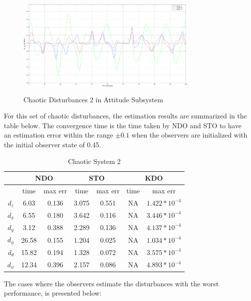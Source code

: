 \documentclass[letterpaper%
, twoside%
, 12pt%
,memoire%
, english%
,creativecommons,hyperref%
]{thETS}
\begin{document}
\begin{figure}[H]
\centering
\includegraphics[width=3.5in,height=2in]{Figures/results/chaotic_disturbances/dis_m2_att.eps}
\caption{Chaotic Disturbances 2 in Attitude Subsystem}
\label{dis_m2_att}
\end{figure}

For this set of chaotic disturbances, the estimation results are summarized in the table below. The convergence time is the time taken by NDO and STO to have an estimation error within the range $\pm0.1$ when the observers are initialized with the initial observer state of 0.45. 

\begin{table}[!htbp]
\centering
\caption{Chaotic System 2}
\begin{tabular}{*7c}
\toprule
{}  &  \multicolumn{2}{c}{NDO} & \multicolumn{2}{c}{STO} & \multicolumn{2}{c}{KDO}\\
\midrule
{}        &   time  & max err  & time  & max err& time  & max err\\
$d_z$     &  6.03 & 0.136   & 3.075  & 0.551 & NA     & $1.422*10^{-4}$\\
$d_x$     &  6.55 & 0.180   & 3.642  & 0.116 & NA     & $3.446*10^{-4}$\\
$d_y$     &  3.12 & 0.388   & 2.289  & 0.136 & NA     & $4.137*10^{-4}$\\
$d_\phi$  &  26.58& 0.155   & 1.204  & 0.025 & NA     & $1.034*10^{-4}$\\
$d_\theta$&  15.82& 0.194   & 1.328  & 0.072 & NA     & $3.575*10^{-4}$\\
$d_\psi$  &  12.34& 0.396   & 2.157  & 0.086 & NA     & $4.893*10^{-4}$\\

\bottomrule
\end{tabular}
\end{table}

The cases where the observers estimate the disturbances with the worst performance, is presented below:
\end{document}
